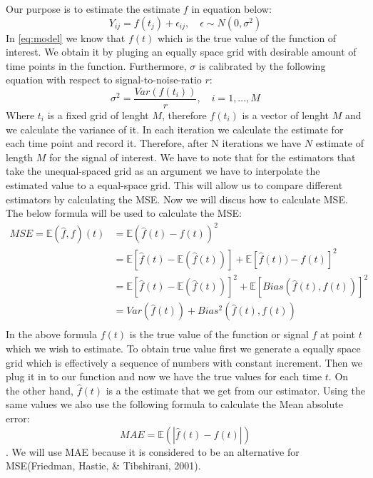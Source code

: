 \documentclass[12pt,twoside, a4paper]{reedthesis}
\begin{document}
Our purpose is to estimate the estimate \(f\) in equation below:
\begin{equation}
Y_{ij}=f(t_j)+\epsilon_{ij},\quad \epsilon\sim N(0,\sigma^2)
\label{eq:model}
\end{equation}
In \eqref{eq:model} we know that \(f(t)\) which is the true value of the function of interest. We obtain it by pluging an equally space grid with desirable amount of time points in the function. Furthermore, \(\sigma\) is calibrated by the following equation with respect to signal-to-noise-ratio \(r\):
\begin{equation}
\sigma^2=\frac{Var(f(t_i))}{r},\quad i=1,\dots,M
\label{eq:noise}
\end{equation}
Where \(t_i\) is a fixed grid of lenght \(M\), therefore \(f(t_i)\) is a vector of lenght \(M\) and we calculate the variance of it. In each iteration we calculate the estimate for each time point and record it. Therefore, after N iterations we have \(N\) estimate of length \(M\) for the signal of interest.
We have to note that for the estimators that take the unequal-spaced grid as an argument we have to interpolate the estimated value to a equal-space grid. This will allow us to compare different estimators by calculating the MSE. Now we will discus how to calculate MSE. The below formula will be used to calculate the MSE:
\[
\begin{aligned}
MSE=\mathbb{E}(\hat f,f)(t)&=\mathbb{E}(\hat f(t)-f(t))^2\\
&=\mathbb{E}[\hat f(t)-\mathbb{E}(\hat f(t))]+\mathbb{E}[\hat f(t))-f(t)]^2\\
&=\mathbb{E}[\hat f(t)-\mathbb{E}(\hat f(t))]^2+\mathbb{E}[Bias(\hat f(t),f(t))]^2\\
&=Var(\hat f(t))+Bias^2(\hat f(t),f(t))\\
\end{aligned}
\]
In the above formula \(f(t)\) is the true value of the function or signal \(f\) at point \(t\) which we wish to estimate. To obtain true value first we generate a equally space grid which is effectively a sequence of numbers with constant increment. Then we plug it in to our function and now we have the true values for each time \(t\). On the other hand, \(\hat f(t)\) is a the estimate that we get from our estimator. Using the same values we also use the following formula to calculate the Mean absolute error:
\[MAE=\mathbb{E}(|\hat f(t)- f(t)|)\].
We will use MAE because it is considered to be an alternative for MSE(Friedman, Hastie, \& Tibshirani, 2001).
\end{document}
